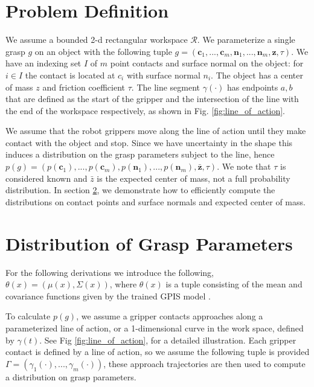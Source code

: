 \documentclass[letterpaper, 10 pt, conference]{ieeeconf}  %
\begin{document}
\section{Problem Definition}


We assume a bounded 2-d rectangular workspace $\mathcal{R}$.
We parameterize a single grasp $g$ on an object with the following tuple $g = ( \textbf{c}_1,...,\textbf{c}_m,\textbf{n}_1,...,\textbf{n}_m,\textbf{z},\tau )$.
We have an indexing set $I$ of $m$ point contacts and surface normal on the object: for $i \in I$ the contact is located at $c_i$ with surface normal $n_i$.
The object has a center of mass $z$ and friction coefficient $\tau$.
The line segment $\gamma(\cdot)$ has endpoints $a,b$ that are defined as the start of the gripper and the intersection of the line with the end of the workspace respectively, as shown in Fig. 
 \ref{fig:line_of_action}.


We assume that the robot grippers move along the line of action until they make contact with the object and stop.
Since we have uncertainty in the shape this induces a distribution on the grasp parameters subject to the line, hence $p(g) = ( p(\textbf{c}_1),...,p(\textbf{c}_m),p(\textbf{n}_1),...,p(\textbf{n}_m),\bar{\textbf{z}},\tau )$.
We note that $\tau$ is considered known and $\bar{z}$ is the expected center of mass, not a full probability distribution. In section \ref{sec:distgrasp}, we demonstrate how to efficiently compute the distributions on contact points and surface normals and expected center of mass. 




\section{Distribution of Grasp Parameters}
\label{sec:distgrasp}

 For the following derivations we introduce the following,
 $\theta(x) = ( \mu(x),\Sigma(x) )$, where $\theta(x)$ is a tuple consisting of the mean and covariance functions given by the trained GPIS model \cite{rasmussen2006} . 
 
 To calculate $p(g)$, we assume a gripper contacts approaches along a parameterized line of action, or a 1-dimensional curve in the work space, defined by $\gamma(t)$. See Fig \ref{fig:line_of_action}, for a detailed illustration. Each gripper contact is defined by a line of action, so we assume the following tuple is provided $\Gamma = ( \gamma_1(\cdot),...,\gamma_m(\cdot) )$, these approach trajectories are then used to compute a distribution on grasp parameters. 
 
\end{document}
